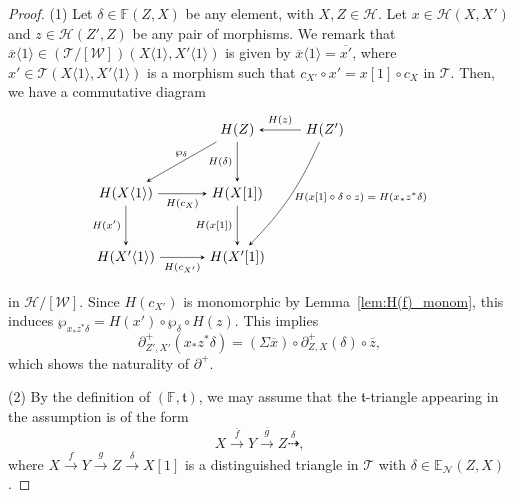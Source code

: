 \documentclass[a4paper,reqno,10pt]{amsart}
\DeclareRobustCommand{\darkblueedit}[1]{#1}
\theoremstyle{definition}
\theoremstyle{definition}
\theoremstyle{definition}
\theoremstyle{definition}
\theoremstyle{plain}
\newcommand{\ft}{\mathfrak{t}}
\newcommand{\BE}{\mathbb{E}}
\newcommand{\BF}{\mathbb{F}}
\newcommand{\CH}{\mathcal{H}}
\newcommand{\CN}{\mathcal{N}}
\newcommand{\CT}{\mathcal{T}}
\newcommand{\CW}{\mathcal{W}}
\begin{document}
\begin{proof}
{\rm (1)} Let $\delta\in\BF(Z,X)$ be any element, with $X,Z\in\CH$. Let $x\in\CH(X,X')$ and $z\in\CH(Z',Z)$ be any pair of morphisms.
We remark that $\overline{x}\langle1\rangle\in\darkblueedit{(\CT/[\CW])}(X\langle1\rangle,X'\langle1\rangle)$ is given by $\overline{x}\langle1\rangle=\overline{x'}$, where  $x'\in\CT(X\langle1\rangle,X'\langle1\rangle)$ is a morphism such that $c_{X'}\circ x'=x[1]\circ c_X$ in $\CT$.
Then, we have a commutative diagram
\[
\begin{tikzpicture}[>=stealth]
\node (1) at (3.6,0.8) {$H(Z')$};
\node (2) at (1.4,0.8) {$H(Z)$};
\node (3) at (-1.4,-0.8) {$H(X\langle1\rangle)$};
\node (4) at (1.4,-0.8) {$H(X[1])$};
\node (5) at (-1.4,-2.4) {$H(X'\langle1\rangle)$};
\node (6) at (1.4,-2.4) {$H(X'[1])$};
\draw[->] (1) -- node[above,font=\scriptsize] {$H(z)$} (2);
\draw[->] (2) -- node[above,font=\scriptsize] {$\wp_{\delta}$} (3);
\draw[->] (2) -- node[left,font=\scriptsize] {$H(\delta)$} (4);
\draw[->] (3) -- node[below,font=\scriptsize] {$H(c_X)$} (4);
\draw[->] (3) -- node[left,font=\scriptsize] {$H(x')$} (5);
\draw[->] (4) -- node[left,font=\scriptsize] {$H(x[1])$} (6);
\draw[->] (5) -- node[below,font=\scriptsize] {$H(c_{X'})$} (6);
\draw[->] (1) to[bend left=10]
  node[right,font=\scriptsize] {$H(x[1]\circ\delta\circ z)=H(x_{\ast}z^{\ast}\delta)$}
  (6);
\end{tikzpicture}
\]
in $\CH/[\CW]$. Since $H(c_{X'})$ is monomorphic by Lemma~\ref{lem:H(f)_monom}, this induces
$\wp_{x_{\ast}z^{\ast}\delta}=H(x')\circ\wp_{\delta}\circ H(z)$.
This implies
\[
\partial^+_{Z',X'}(x_{\ast}z^{\ast}\delta)=(\Sigma\overline{x})\circ\partial^+_{Z,X}(\delta)\circ\overline{z},
\]
which shows the naturality of $\partial^+$.

{\rm (2)} By the definition of $(\BF,\ft)$, we may assume that the $\ft$-triangle appearing in the assumption is of the form
\[
X\xrightarrow{\overline{f}}Y\xrightarrow{\overline{g}}Z\overset{\delta}{\dashrightarrow},
\]
where $X\xrightarrow{f}Y\xrightarrow{g}Z\xrightarrow{\delta}X[1]$ is a distinguished triangle in $\CT$ with $\delta\in\BE_{\CN}(Z,X)$.


\end{proof}
\end{document}
